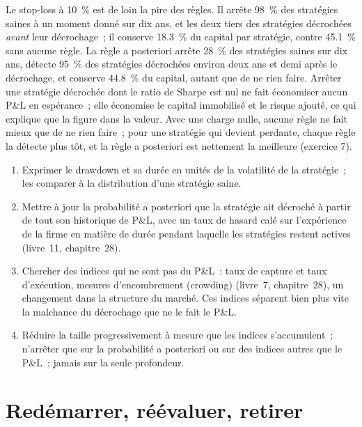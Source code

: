 Le stop-loss à 10~\% est de loin la pire des règles. Il arrête 98~\% des stratégies saines à un moment donné sur dix ans, et les deux tiers des stratégies décrochées
\emph{avant} leur décrochage~; il conserve 18.3~\% du capital par stratégie, contre 45.1~\% sans aucune règle. La règle a posteriori arrête 28~\% des stratégies saines
sur dix ans, détecte 95~\% des stratégies décrochées environ deux ans et demi après le décrochage, et conserve 44.8~\% du capital, autant que
de ne rien faire. Arrêter une stratégie décrochée dont le ratio de Sharpe est nul ne fait économiser aucun P\&L en espérance~; elle économise le capital immobilisé et le risque ajouté,
ce qui explique que la  figure dans la valeur. Avec une charge nulle, aucune règle ne fait mieux que de ne rien faire~; pour une stratégie qui devient perdante, chaque
règle la détecte plus tôt, et la règle a posteriori est nettement la meilleure (exercice 7).

\begin{method}\label{met:fm:managing-a-book-through-drawdown:review}
\begin{enumerate}
\item Exprimer le drawdown et sa durée en unités de la volatilité de la stratégie~; les comparer à la distribution d'une stratégie saine.
\item Mettre à jour la probabilité a posteriori que la stratégie ait décroché à partir de tout son historique de P\&L, avec un taux de hasard calé sur l'expérience de la firme en matière de durée
pendant laquelle les stratégies restent actives (livre~11, chapitre~28).
\item Chercher des indices qui ne sont pas du P\&L~: taux de capture et taux d'exécution, mesures d'encombrement (crowding) (livre~7, chapitre~28), un changement dans la structure du
marché. Ces indices séparent bien plus vite la malchance du décrochage que ne le fait le P\&L.
\item Réduire la taille progressivement à mesure que les indices s'accumulent~; n'arrêter que sur la probabilité a posteriori ou sur des indices autres que le P\&L~; jamais sur la seule profondeur.
\end{enumerate}
\end{method}

\section{Redémarrer, réévaluer, retirer}

